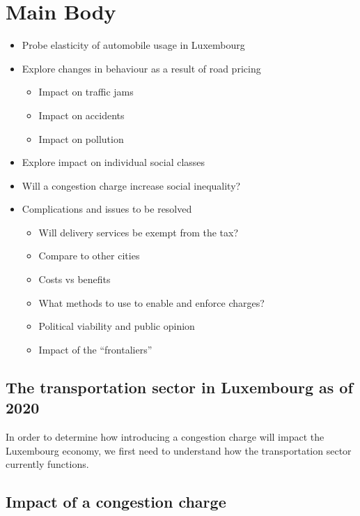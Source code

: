 \documentclass[
      a4paper,
        12pt,
          oneside,
      ]{article}
\providecommand{\tightlist}{
  \setlength{\itemsep}{0pt}
  \setlength{\parskip}{0pt}
}
\begin{document}
\hypertarget{main-body}{%
\section{Main Body}\label{main-body}}

\begin{itemize}
\tightlist
\item
  Probe elasticity of automobile usage in Luxembourg
\item
  Explore changes in behaviour as a result of road pricing

  \begin{itemize}
  \tightlist
  \item
    Impact on traffic jams
  \item
    Impact on accidents
  \item
    Impact on pollution
  \end{itemize}
\item
  Explore impact on individual social classes
\item
  Will a congestion charge increase social inequality?
\item
  Complications and issues to be resolved

  \begin{itemize}
  \tightlist
  \item
    Will delivery services be exempt from the tax?
  \item
    Compare to other cities
  \item
    Costs vs benefits
  \item
    What methods to use to enable and enforce charges?
  \item
    Political viability and public opinion
  \item
    Impact of the ``frontaliers''
  \end{itemize}
\end{itemize}

\hypertarget{the-transportation-sector-in-luxembourg-as-of-2020}{%
\subsection{The transportation sector in Luxembourg as of
2020}\label{the-transportation-sector-in-luxembourg-as-of-2020}}

In order to determine how introducing a congestion charge will impact
the Luxembourg economy, we first need to understand how the
transportation sector currently functions.

\hypertarget{impact-of-a-congestion-charge}{%
\subsection{Impact of a congestion
charge}\label{impact-of-a-congestion-charge}}
\end{document}
